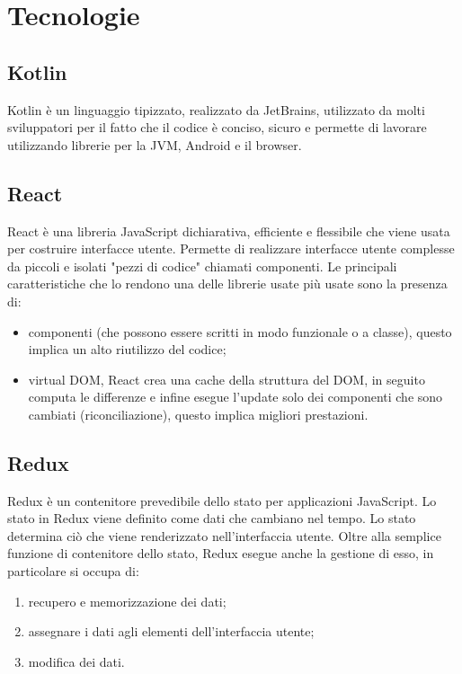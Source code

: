 
\chapter{Tecnologie}
\label{cap:tecnologie-strumenti}


\section{Kotlin}
Kotlin è un linguaggio tipizzato, realizzato da JetBrains, utilizzato da molti sviluppatori per il fatto che il codice è conciso, sicuro e permette di lavorare utilizzando librerie per la JVM, Android e il browser.

\section{React}
React è una libreria JavaScript dichiarativa, efficiente e flessibile che viene usata per costruire interfacce utente. Permette di realizzare interfacce utente complesse da piccoli e isolati "pezzi di codice" chiamati componenti. Le principali caratteristiche che lo rendono una delle librerie usate più usate sono la presenza di:
\begin{itemize}
	\item componenti (che possono essere scritti in modo funzionale o a classe), questo implica un alto riutilizzo del codice;
	\item virtual DOM, React crea una cache della struttura del DOM, in seguito computa le differenze e infine esegue l'update solo dei componenti che sono cambiati (riconciliazione), questo implica migliori prestazioni. 
\end{itemize}

\section{Redux}
Redux è un contenitore prevedibile dello stato per applicazioni JavaScript. Lo stato in Redux viene definito come dati che cambiano nel tempo. Lo stato determina ciò che viene renderizzato nell'interfaccia utente. Oltre alla semplice funzione di contenitore dello stato, Redux esegue anche la gestione di esso, in particolare si occupa di:
\begin{enumerate}
	\item recupero e memorizzazione dei dati;
	\item assegnare i dati agli elementi dell'interfaccia utente;
	\item modifica dei dati.
\end{enumerate}


